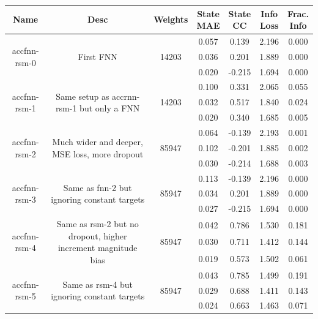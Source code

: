 \begin{table}[H]
\centering
\begin{sideways}
    \begin{tabular}{c|c|c|c|c|c|c }
	\small
Name & Desc & Weights & \thead{State\\MAE} & \thead{State\\CC} & \thead{Info\\Loss} &\thead{Frac.\\Info}\\
\hline
\multirow{3}{6em}{accfnn-rsm-0} & \multirow{3}{16em}{First FNN} & \multirow{3}{4em}{14203} & 0.057 & 0.139 & 2.196 & 0.000 \\ & & & 0.036 & 0.201 & 1.889 & 0.000 \\ & & & 0.020 & -0.215 & 1.694 & 0.000 \\
\hline
\multirow{3}{6em}{accfnn-rsm-1} & \multirow{3}{16em}{Same setup as accrnn-rsm-1 but only a FNN} & \multirow{3}{4em}{14203} & 0.100 & 0.331 & 2.065 & 0.055 \\ & & & 0.032 & 0.517 & 1.840 & 0.024 \\ & & & 0.020 & 0.340 & 1.685 & 0.005 \\
\hline
\multirow{3}{6em}{accfnn-rsm-2} & \multirow{3}{16em}{Much wider and deeper, MSE loss, more dropout} & \multirow{3}{4em}{85947} & 0.064 & -0.139 & 2.193 & 0.001 \\ & & & 0.102 & -0.201 & 1.885 & 0.002 \\ & & & 0.030 & -0.214 & 1.688 & 0.003 \\
\hline
\multirow{3}{6em}{accfnn-rsm-3} & \multirow{3}{16em}{Same as fnn-2 but ignoring constant targets} & \multirow{3}{4em}{85947} & 0.113 & -0.139 & 2.196 & 0.000 \\ & & & 0.034 & 0.201 & 1.889 & 0.000 \\ & & & 0.027 & -0.215 & 1.694 & 0.000 \\
\hline
\multirow{3}{6em}{accfnn-rsm-4} & \multirow{3}{16em}{Same as rsm-2 but no dropout, higher increment magnitude bias} & \multirow{3}{4em}{85947} & 0.042 & 0.786 & 1.530 & 0.181 \\ & & & 0.030 & 0.711 & 1.412 & 0.144 \\ & & & 0.019 & 0.573 & 1.502 & 0.061 \\
\hline
\multirow{3}{6em}{accfnn-rsm-5} & \multirow{3}{16em}{Same as rsm-4 but ignoring constant targets} & \multirow{3}{4em}{85947} & 0.043 & 0.785 & 1.499 & 0.191 \\ & & & 0.029 & 0.688 & 1.411 & 0.143 \\ & & & 0.024 & 0.663 & 1.463 & 0.071 \\

\end{tabular}
\end{sideways}
\end{table}
